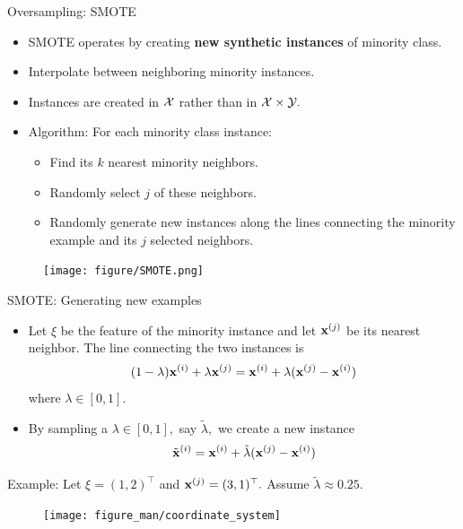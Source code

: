 \documentclass[11pt,compress,t,notes=noshow, xcolor=table]{beamer}
\begin{document}
\begin{frame}{Oversampling: SMOTE}
    \begin{itemize}
        \item SMOTE operates by creating \textbf{new synthetic instances} of minority class.

        \item Interpolate between neighboring minority instances.

        \item Instances are created in $\mathcal{X}$ rather than in $\mathcal{X}\times\mathcal{Y}.$

        \item Algorithm: For each minority class instance: 

        \begin{itemize} 

            \item Find its $k$ nearest minority neighbors.
    
            \item Randomly select $j$ of these neighbors.
    
            \item Randomly generate new instances along the lines connecting the minority example and its $j$ selected neighbors.
    
        \end{itemize}
    \end{itemize}
    
    \begin{figure}
        \centering
        \texttt{[image: figure/SMOTE.png]} 
    \end{figure}


\end{frame}

\begin{frame}{SMOTE: Generating new examples}
    
    \begin{itemize}

        \item Let $\xi$ be the feature of the minority instance and let $\mathbf{x}^{(j)}$ be its nearest neighbor. The line connecting the two instances is
        $$		(1-\lambda) \mathbf{x}^{(i)} + \lambda\mathbf{x}^{(j)} = \mathbf{x}^{(i)} + \lambda(\mathbf{x}^{(j)} - \mathbf{x}^{(i)})	$$
        where $\lambda \in [0,1].$		
        
        \item By sampling a $\lambda \in [0,1],$ say $\tilde{\lambda},$ we create a new instance		
        $$   \tilde{\mathbf{x}}^{(i)} =  \mathbf{x}^{(i)} + \tilde{\lambda}(\mathbf{x}^{(j)} - \mathbf{x}^{(i)})	 $$

    \end{itemize}		
        
        Example: Let $\xi = (1,2)^\top$ and $\mathbf{x}^{(j)} = (3,1)^\top.$ Assume $\tilde{\lambda} \approx 0.25.$
    \begin{figure}
        \centering
        \texttt{[image: figure\_man/coordinate\_system]}
    \end{figure}

\end{frame}
\end{document}
